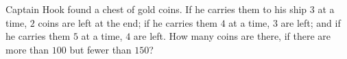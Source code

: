 Captain Hook found a chest of gold coins. If he carries them to his ship $3$ at a time, $2$ coins are left at the end; if he carries them $4$ at a time, $3$ are left; and if he carries them $5$ at a time, $4$ are left. How many coins are there, if there are more than $100$ but fewer than $150$?
